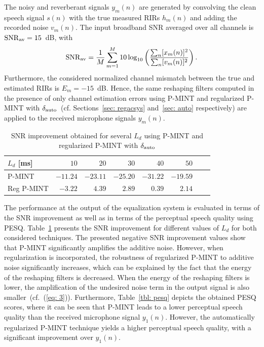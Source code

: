 \documentclass[10pt]{IEEEtran}
\begin{document}
The noisy and reverberant signals $y_m(n)$ are generated by convolving the clean speech signal $s(n)$ with the true measured RIRs $h_m(n)$ and adding the recorded noise $v_m(n)$. 
The input broadband SNR averaged over all channels is ${\rm SNR}_{\rm av} = 15$~dB, with
\begin{equation}
  {\rm SNR}_{\rm av} = \frac{1}{M} \sum_{m = 1}^M 10 \log_{10} \left( \frac{\sum_{n} [x_m(n)]^2}{\sum_{n} [v_m(n)]^2}\right).
\end{equation}
Furthermore, the considered normalized channel mismatch between the true and estimated RIRs is $E_m = -15$~dB.
Hence, the same reshaping filters computed in the presence of only channel estimation errors using P-MINT and regularized P-MINT with $\delta_{\rm auto}$~(cf. Sections~\ref{sec: regacsys} and~\ref{sec: auto} respectively)  are applied to the received microphone signals $y_m(n)$.
\begin{table}[b!]
\centering
\caption{SNR improvement obtained for several $L_d$ using P-MINT and regularized P-MINT with $\delta_{\rm auto}$}
\label{tbl: snr}
\begin{tabular}{|l|r|r|r|r|r|r|r|}
\hline
$L_d$ [ms] & $10$ & $20$ & $30$ & $40$ & $50$ \\
\hline
P-MINT & $-11.24$ & $-23.11$ & $-25.20$ & $-31.22$ & $-19.59$  \\
\hline
Reg P-MINT & $-3.22$ & $4.39$ & $2.89$ & $0.39$ & $2.14$  \\
\hline
\end{tabular}

\end{table}
The performance at the output of the equalization system is evaluated in terms of the SNR improvement as well as in terms of the perceptual speech quality using PESQ.
Table~\ref{tbl: snr} presents the SNR improvement for different values of $L_d$ for both considered techniques.
The presented negative SNR improvement values show that P-MINT significantly amplifies the additive noise.
However, when regularization is incorporated, the robustness of regularized P-MINT to additive noise significantly increases, which can be explained by the fact that the energy of the reshaping filters is decreased.
When the energy of the reshaping filters is lower, the amplification of the undesired noise term in the output signal is also smaller~(cf.~(\ref{eq: 3})).
Furthermore, Table~\ref{tbl: pesq} depicts the obtained PESQ scores, where it can be seen that P-MINT leads to a lower perceptual speech quality than the received microphone signal $y_1(n)$. 
However, the automatically regularized P-MINT technique yields a higher perceptual speech quality, with a significant improvement over $y_1(n)$.
\end{document}
